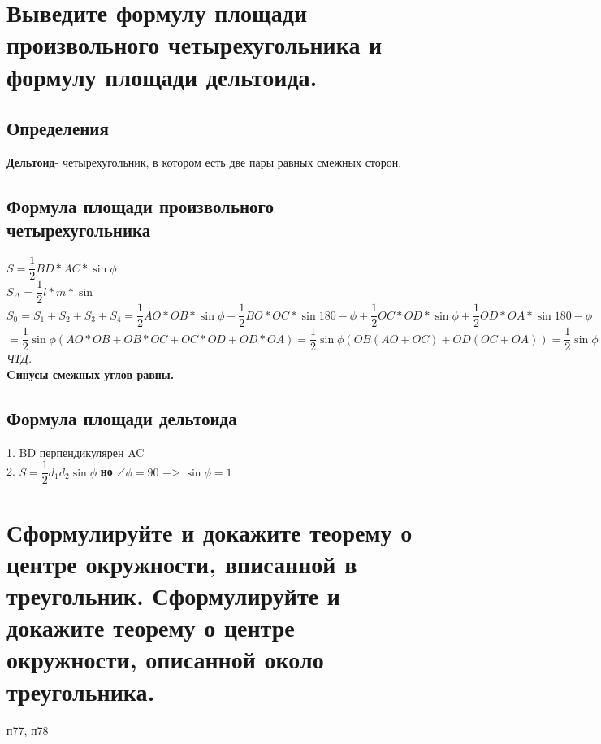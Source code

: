 \documentclass[12pt, letterpaper]{article}
\begin{document}
\section {Выведите формулу площади произвольного четырехугольника и формулу площади дельтоида.}
\subsection{Определения}
\textbf{Дельтоид}- четырехугольник, в котором есть две пары равных смежных сторон. \\

\subsection{Формула площади произвольного четырехугольника}

$S=\dfrac{1}{2}BD*AC*\sin{\phi}$\\
$S_\Delta=\dfrac{1}{2}l*m*\sin{}$\\
$S_0 = S_1 + S_2 + S_3 + S_4 = \dfrac{1}{2}AO*OB * \sin{\phi} + \dfrac{1}{2}BO*OC*\sin{180-\phi} + \dfrac{1}{2}OC*OD*\sin{\phi} + \dfrac{1}{2}OD*OA*\sin{180-\phi}$
$=\dfrac{1}{2}\sin{\phi}(AO*OB+OB*OC+OC*OD+OD*OA)=\dfrac{1}{2}\sin{\phi}(OB(AO+OC)+OD(OC+OA))=\dfrac{1}{2}\sin{\phi}(OB+OD)(AO+OC)=\dfrac{1}{2}\sin{\phi}BD*AC$ \\
\textit{ЧТД.}\\
\textbf{Cинусы смежных углов равны.}

\subsection{Формула площади дельтоида}
1. BD перпендикулярен AC \\
2. $ S=\dfrac{1}{2} d_1 d_2 \sin{\phi} $ \textbf{но} $\angle \phi = 90$ => $\sin{\phi}=1$ \\


\section {Сформулируйте и докажите теорему о центре окружности, вписанной в треугольник. Сформулируйте и докажите теорему о центре окружности, описанной около треугольника.}
п77, п78
\end{document}
